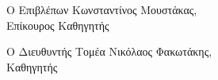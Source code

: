 \begin{minipage}[!t]{3.0in}
\begin{center}
{\Large
Ο Επιβλέπων
\vskip1cm
Κωνσταντίνος Μουστάκας,\\ Επίκουρος Καθηγητής
}
\end{center}
\end{minipage}
\hspace{0.27in}
\begin{minipage}[!t]{3.0in}
{\Large
\begin{center}
Ο Διευθυντής Τομέα
\vskip1cm
Νικόλαος Φακωτάκης,\\ Καθηγητής
\end{center}}
\end{minipage}
\clearpage
\clearpage
\null\clearpage %


